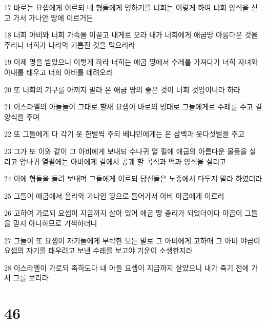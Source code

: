 \par 17 바로는 요셉에게 이르되 네 형들에게 명하기를 너희는 이렇게 하여 너희 양식을 싣고 가서 가나안 땅에 이르거든
\par 18 너희 아비와 너희 가속을 이끌고 내게로 오라 내가 너희에게 애굽땅 아름다운 것을 주리니 너희가 나라의 기름진 것을 먹으리라
\par 19 이제 명을 받았으니 이렇게 하라 너희는 애굽 땅에서 수레를 가져다가 너희 자녀와 아내를 태우고 너희 아비를 데려오라
\par 20 또 너희의 기구를 아끼지 말라 온 애굽 땅의 좋은 것이 너희 것임이니라 하라
\par 21 이스라엘의 아들들이 그대로 할새 요셉이 바로의 명대로 그들에게로 수레를 주고 길 양식을 주며
\par 22 또 그들에게 다 각기 옷 한벌씩 주되 베냐민에게는 은 삼백과 옷다섯벌을 주고
\par 23 그가 또 이와 같이 그 아비에게 보내되 수나귀 열 필에 애굽의 아름다운 물품을 실리고 암나귀 열필에는 아비에게 길에서 공궤 할 곡식과 떡과 양식을 실리고
\par 24 이에 형들을 돌려 보내며 그들에게 이르되 당신들은 노중에서 다투지 말라 하였더라
\par 25 그들이 애굽에서 올라와 가나안 땅으로 들어가서 아비 야곱에게 이르러
\par 26 고하여 가로되 요셉이 지금까지 살아 있어 애굽 땅 총리가 되었더이다 야곱이 그들을 믿지 아니하므로 기색하더니
\par 27 그들이 또 요셉이 자기들에게 부탁한 모든 말로 그 아비에게 고하매 그 아비 야곱이 요셉의 자기를 태우려고 보낸 수레를 보고야 기운이 소생한지라
\par 28 이스라엘이 가로되 족하도다 내 아들 요셉이 지금까지 살았으니 내가 죽기 전에 가서 그를 보리라

\chapter{46}

